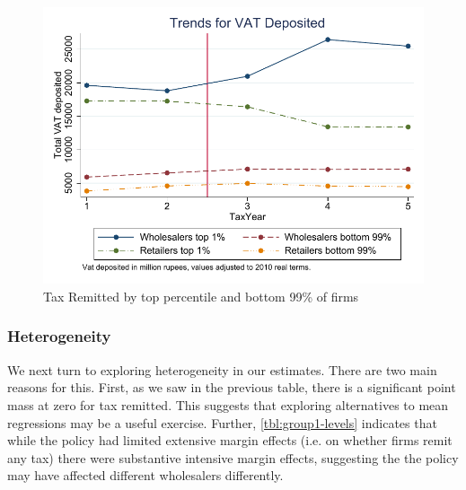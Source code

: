 
\begin{figure}[h] 
\includegraphics{graphs/MoneyDepositedTrendsTopPercentilePanel_Annual_Real.pdf}
\caption{Tax Remitted by top percentile and bottom 99\% of firms}
\label{fig:money-onepercentile}
\end{figure}

\subsubsection{Heterogeneity}
\label{subsubsec:diffindiff_heterogeneity}
We next turn to exploring heterogeneity in our estimates. There are two main reasons for this. First, as we saw in the previous table, there is a significant point mass at zero for tax remitted. This suggests that exploring alternatives to mean regressions may be a useful exercise. Further, \cref{tbl:group1-levels} indicates that while the policy had limited extensive margin effects (i.e. on whether firms remit any tax) there were substantive intensive margin effects, suggesting the the policy may have affected different wholesalers differently.


